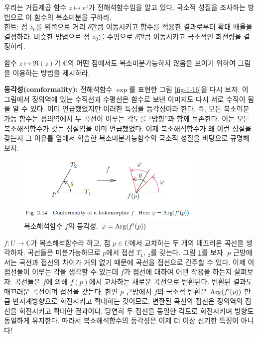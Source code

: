 \begin{salt_exercise}\label{ex-2-17}
우리는 거듭제곱 함수 $z\mapsto e^z$가 전해석함수임을 알고 있다.
국소적 성질을 조사하는 방법으로 이 함수의 복소미분을 구하라. \\[1ex]
힌트:  점 $z_0$를 위쪽으로 거리 $\delta$만큼 이동시키고
함수를 적용한 결과로부터 확대 배율을 결정하라.
비슷한 방법으로 
점 $z_0$를 수평으로 $\delta$만큼 이동시키고
국소적인 회전량을 결정하라.
\end{salt_exercise}

\begin{salt_exercise}\label{ex-2-18}
함수 $z\mapsto \Re(z)$가 
$\mathbb C$의 어떤 점에서도 복소미분가능하지 않음을 보이기 위하여
그림을 이용하는 방법을 제시하라.
\end{salt_exercise}

{\bf 등각성(comformality):}
전해석함수 $\exp$를 표현한 그림 \ref{fig-1-16}을 다시 보자.
이 그림에서 정의역에 있는 수직선과 수평선은 함수로 보낸 이미지도
다시 서로 수직이 됨을 알 수 있다.
이미 언급했었지만 이러한 특성을 등각성이라 한다.
즉, 모든 복소미분가능 함수는 정의역에서 두 곡선이 이루는 각도를 ``방향''과 함께 
보존한다. 이는 모든 복소해석함수가 갖는 성질임을 이미 언급했었다.
이제 복소해석함수가 왜 이런 성질을 갖는지 그 이유를
앞에서 학습한 복소미분가능함수의 국소적 성질을 바탕으로 규명해보자.

\begin{figure}[!h]
\begin{center}
\includegraphics[width=0.8\textwidth]{./SaltChapter/fig-2-14}
\end{center}
\caption{복소해석함수 $f$의 등각성.  $\varphi = \mathop{\mathrm{Arg}}(f'(p))$}
\label{fig-2-14}
\end{figure}

$f: U\to \mathbb C$가 복소해석함수라 하고,
점 $p\in U$에서 교차하는 두 개의 매끄러운 곡선을 생각하자.
곡선들은 미분가능하므로 $p$에서 접선 $T_1$, $_2$를 갖는다.
그림 \ref{fig-2-14}를 보자. 
$p$ 근방에서는 곡선과 접선의 차이가 거의 없기 때문에
곡선을 접선으로 간주할 수 있다.
이제 이 접선들이 이루는 각을 생각할 수 있는데  $f$가 접선에 대하여 어떤 작용을 하는지 살펴보자.
곡선들은 $f$에 의해 $f(p)$에서 교차하는 새로운 곡선으로 변환된다.
변환된 결과도 매끄러운 곡선이며 접선을 갖는다.
한편 $p$ 근방에서 $f$의 국소적 변환은 $\mathop{\mathrm{Arg}}(f'(p))$ 만큼 반시계방향으로 회전시키고
확대하는 것이므로, 변환된 곡선의 접선은
정의역의 접선을 회전시키고 확대한 결과이다.
당연히 두 접선을 동일한 각도로 회전시키며 방향도 동일하게 유지한다.
따라서 복소해석함수의 등각성은 이제 더 이상 신기한 특징이 아니다!

